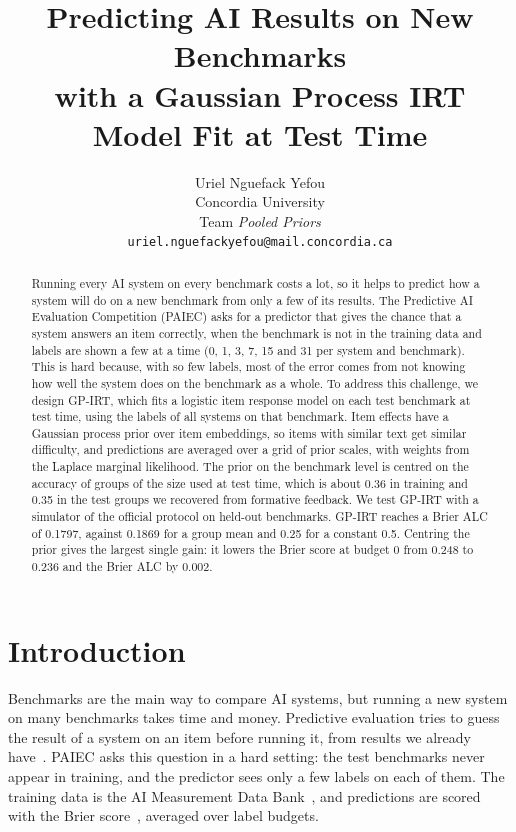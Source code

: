 \documentclass{article}
\title{Predicting AI Results on New Benchmarks\\with a Gaussian Process IRT Model Fit at Test Time}
\author{%
  Uriel Nguefack Yefou\\
  Concordia University\\
  Team \emph{Pooled Priors}\\
  \texttt{uriel.nguefackyefou@mail.concordia.ca}
}
\begin{document}
\maketitle

\begin{abstract}
Running every AI system on every benchmark costs a lot, so it helps to predict how a system will do on a new benchmark
from only a few of its results. The Predictive AI Evaluation Competition (PAIEC) asks for a predictor that gives the
chance that a system answers an item correctly, when the benchmark is not in the training data and labels are shown a
few at a time (0, 1, 3, 7, 15 and 31 per system and benchmark). This is hard because, with so few labels, most of the
error comes from not knowing how well the system does on the benchmark as a whole. To address this challenge, we
design GP-IRT, which fits a logistic item response model on each test benchmark at test time, using the labels of all
systems on that benchmark. Item effects have a Gaussian process prior over item embeddings, so items with similar text
get similar difficulty, and predictions are averaged over a grid of prior scales, with weights from the Laplace
marginal likelihood. The prior on the benchmark level is centred on the accuracy of groups of the size used at test
time, which is about 0.36 in training and 0.35 in the test groups we recovered from formative feedback. We test GP-IRT
with a simulator of the official protocol on held-out benchmarks. GP-IRT reaches a Brier ALC of 0.1797, against 0.1869
for a group mean and 0.25 for a constant 0.5. Centring the prior gives the largest single gain: it lowers the Brier
score at budget 0 from 0.248 to 0.236 and the Brier ALC by 0.002.
\end{abstract}

\section{Introduction}
Benchmarks are the main way to compare AI systems, but running a new system on many benchmarks takes time and money.
Predictive evaluation tries to guess the result of a system on an item before running it, from results we already
have~\citep{paiec2026}. PAIEC asks this question in a hard setting: the test benchmarks never appear in training, and
the predictor sees only a few labels on each of them. The training data is the AI Measurement Data
Bank~\citep{measurementdb2026}, and predictions are scored with the Brier score~\citep{glenn1950verification}, averaged
over label budgets.
\end{document}
